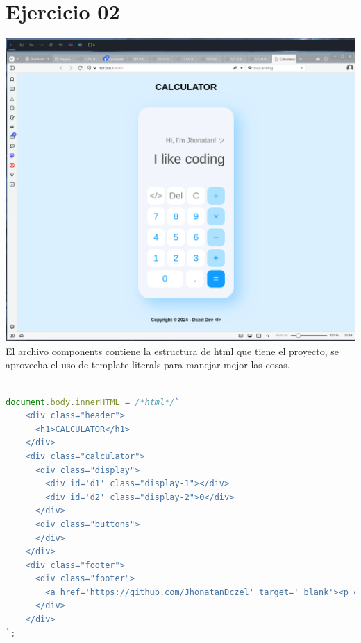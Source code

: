 
\section{Ejercicio 02}
\includegraphics[width=1\textwidth]{./img/ejercicio02.png}
El archivo components contiene la estructura de html que tiene el proyecto, se aprovecha el uso de template literals para manejar mejor las cosas.
\begin{lstlisting}[language=JavaScript, caption={Archivo components.js}]

document.body.innerHTML = /*html*/`
    <div class="header">
      <h1>CALCULATOR</h1>
    </div>
    <div class="calculator">
      <div class="display">
        <div id='d1' class="display-1"></div>
        <div id='d2' class="display-2">0</div>
      </div>
      <div class="buttons">
      </div>
    </div>
    <div class="footer">
      <div class="footer">
        <a href='https://github.com/JhonatanDczel' target='_blank'><p class="autor">Copyright © 2023 - Dczel Dev <span class="icon">&lt;/&gt;</span></p></a>
      </div>
    </div>
`;
\end{lstlisting}

